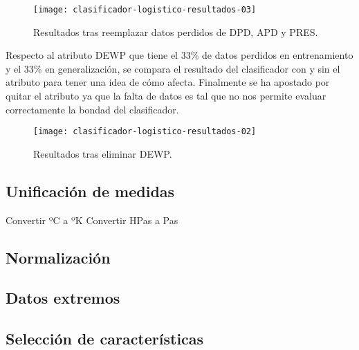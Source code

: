\begin{figure}[ht]
    \centering
    \texttt{[image: clasificador-logistico-resultados-03]}
    \caption{Resultados tras reemplazar datos perdidos de DPD, APD y PRES.}
    \label{fig:clasificador-logistico-resultados-02a}
\end{figure}

Respecto al atributo DEWP que tiene el 33\% de datos perdidos en entrenamiento y el 33\% en generalización, se compara el resultado del clasificador con y sin el atributo para tener una idea de cómo afecta. Finalmente se ha apostado por quitar el atributo ya que la falta de datos es tal que no nos permite evaluar correctamente la bondad del clasificador.

\begin{figure}[ht]
    \centering
    \texttt{[image: clasificador-logistico-resultados-02]}
    \caption{Resultados tras eliminar DEWP.}
    \label{fig:clasificador-logistico-resultados-02b}
\end{figure}

\subsection{Unificación de medidas}
Convertir ºC a ºK
Convertir HPas a Pas

\subsection{Normalización}


\subsection{Datos extremos}


\subsection{Selección de características}


